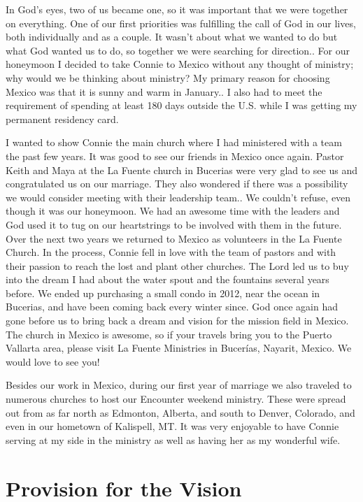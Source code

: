 \documentclass[twoside, 12pt]{book}
\begin{document}
In God’s eyes, two of us became one, so it was important that we were together on everything. One of our first priorities was fulfilling the call of God in our lives, both individually and as a couple. It wasn’t about what we wanted to do but what God wanted us to do, so together we were searching for direction.. 
For our honeymoon I decided to take Connie to Mexico without any thought of ministry; why would we be thinking about ministry? My primary reason for choosing Mexico was that it is sunny and warm in January.. I also had to meet the requirement of spending at least 180 days outside the U.S. while I was getting my permanent residency card. 

I wanted to show Connie the main church where I had ministered with a team the past few years. It was good to see our friends in Mexico once again. Pastor Keith and Maya at the La Fuente church in Bucerias were very glad to see us and congratulated us on our marriage. They also wondered if there was a possibility we would consider meeting with their leadership team.. We couldn’t refuse, even though it was our honeymoon. We had an awesome time with the leaders and God used it to tug on our heartstrings to be involved with them in the future. Over the next two years we returned to Mexico as volunteers in the La Fuente Church. In the process, Connie fell in love with the team of pastors and with their passion to reach the lost and plant other churches. The Lord led us to buy into the dream I had about the water spout and the fountains several years before. We ended up purchasing a small condo in 2012, near the ocean in Bucerias, and have been coming back every winter since. God once again had gone before us to bring back a dream and vision for the mission field in Mexico. The church in Mexico is awesome, so if your travels bring you to the Puerto Vallarta area, please visit La Fuente Ministries in Bucerías, Nayarit, Mexico. We would love to see you! 

Besides our work in Mexico, during our first year of marriage we also traveled to numerous churches to host our Encounter weekend ministry. These were spread out from as far north as Edmonton, Alberta, and south to Denver, Colorado, and even in our hometown of Kalispell, MT. It was very enjoyable to have Connie serving at my side in the ministry as well as having her as my wonderful wife. 



\section{Provision for the Vision}
\
\end{document}

